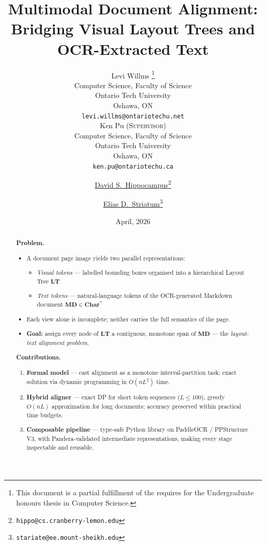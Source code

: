 \documentclass{article}
\title{Multimodal Document Alignment: Bridging Visual Layout Trees and OCR-Extracted Text}
\date{April, 2026}
\author{
  {Levi Willms}
  \thanks{
    This document is a partial fulfillment of the requires for the Undergraduate honours thesis in Computer Science.
  } \\
  Computer Science, Faculty of Science\\
  Ontario Tech University\\
  Oshawa, ON \\
  \texttt{levi.willms@ontariotechu.net} \\
  \And
  {Ken Pu (\textsc{Supervisor})} \\
  Computer Science, Faculty of Science\\
  Ontario Tech University\\
  Oshawa, ON \\
  \texttt{ken.pu@ontariotechu.ca} \\
}
\author[1]{%
  \href{https://orcid.org/0000-0000-0000-0000}{\usebox{\orcid}\hspace{1mm}David S.~Hippocampus\thanks{\texttt{hippo@cs.cranberry-lemon.edu}}}%
}
\author[1,2]{%
  \href{https://orcid.org/0000-0000-0000-0000}{\usebox{\orcid}\hspace{1mm}Elias D.~Striatum\thanks{\texttt{stariate@ee.mount-sheikh.edu}}}%
}
\affil[1]{Department of Computer Science, Cranberry-Lemon University, Pittsburgh, PA 15213}
\affil[2]{Department of Electrical Engineering, Mount-Sheikh University, Santa Narimana, Levand}
\theoremstyle{definition}
\begin{document}
\maketitle

\begin{abstract}
  \textbf{Problem.}
  \begin{itemize}
    \item A document page image yields two parallel representations:
          \begin{itemize}
            \item \emph{Visual tokens} --- labelled bounding boxes organised into a
                  hierarchical Layout Tree $\mathbf{LT}$
            \item \emph{Text tokens} --- natural-language tokens of the OCR-generated
                  Markdown document $\mathbf{MD} \in \mathbf{Char}^{*}$
          \end{itemize}
    \item Each view alone is incomplete; neither carries the full semantics of the page.
    \item \textbf{Goal:} assign every node of $\mathbf{LT}$ a contiguous, monotone span
          of $\mathbf{MD}$ --- the \emph{layout-text alignment problem}.
  \end{itemize}

  \medskip
  \textbf{Contributions.}
  \begin{enumerate}
    \item \textbf{Formal model} --- cast alignment as a monotone interval-partition task;
          exact solution via dynamic programming in $O(nL^{2})$ time.
    \item \textbf{Hybrid aligner} --- exact DP for short token sequences ($L \le 100$),
          greedy $O(nL)$ approximation for long documents; accuracy preserved within
          practical time budgets.
    \item \textbf{Composable pipeline} --- type-safe Python library on PaddleOCR /
          PPStructure\,V3, with Pandera-validated intermediate representations, making
          every stage inspectable and reusable.
  \end{enumerate}
\end{abstract}


\end{document}
